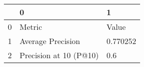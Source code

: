 \begin{tabular}{lll}
\toprule
{} &                       0 &         1 \\
\midrule
0 &                  Metric &     Value \\
1 &       Average Precision &  0.770252 \\
2 &  Precision at 10 (P@10) &       0.6 \\
\bottomrule
\end{tabular}
